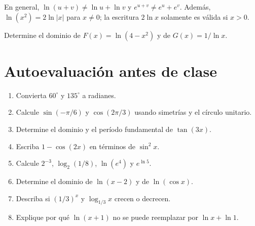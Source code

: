 \documentclass[10pt,a5paper]{article}
\newif\ifmostrarSoluciones
\begin{document}
\begin{nota}
En general, $\ln(u+v)\neq\ln u+\ln v$ y $e^{u+v}\neq e^u+e^v$. Además, $\ln(x^2)=2\ln|x|$ para $x\neq0$; la escritura $2\ln x$ solamente es válida si $x>0$.
\end{nota}

\begin{ejemplo}
Determine el dominio de $F(x)=\ln(4-x^2)$ y de $G(x)=1/\ln x$.
\end{ejemplo}
\ifmostrarSoluciones
\begin{solucion}
Para $F$, se exige $4-x^2>0$, por lo que $D_F=(-2,2)$. Para $G$, se exige $x>0$ y $\ln x\neq0$; como $\ln x=0$ solamente en $x=1$, se tiene $D_G=(0,1)\cup(1,\infty)$.
\end{solucion}
\fi

\section*{Autoevaluación antes de clase}
\begin{ejercicios}
\begin{enumerate}
  \item Convierta $60^\circ$ y $135^\circ$ a radianes.
  \item Calcule $\sin(-\pi/6)$ y $\cos(2\pi/3)$ usando simetrías y el círculo unitario.
  \item Determine el dominio y el período fundamental de $\tan(3x)$.
  \item Escriba $1-\cos(2x)$ en términos de $\sin^2x$.
  \item Calcule $2^{-3}$, $\log_2(1/8)$, $\ln(e^4)$ y $e^{\ln5}$.
  \item Determine el dominio de $\ln(x-2)$ y de $\ln(\cos x)$.
  \item Describa si $(1/3)^x$ y $\log_{1/3}x$ crecen o decrecen.
  \item Explique por qué $\ln(x+1)$ no se puede reemplazar por $\ln x+\ln1$.
\end{enumerate}
\end{ejercicios}
\ifmostrarSoluciones
\begin{solucion}[de la autoevaluación]
\begin{enumerate}
  \item $\pi/3$ y $3\pi/4$.
  \item $-1/2$ y $-1/2$.
  \item Se excluye $x=\pi/6+k\pi/3$ para $k\in\mathbb{Z}$; el período es $\pi/3$.
  \item $1-\cos(2x)=2\sin^2x$.
  \item $1/8$, $-3$, $4$ y $5$, respectivamente.
  \item Para la primera, $(2,\infty)$. Para la segunda, se exige $\cos x>0$, es decir,
  \[
    \bigcup_{k\in\mathbb{Z}}(-\pi/2+2k\pi,\pi/2+2k\pi).
  \]
  \item Ambas son estrictamente decrecientes en sus respectivos dominios.
  \item La propiedad corresponde a un producto, no a una suma. Por ejemplo, en $x=1$, $\ln2\neq\ln1+\ln1=0$.
\end{enumerate}
\end{solucion}
\fi
\end{document}
